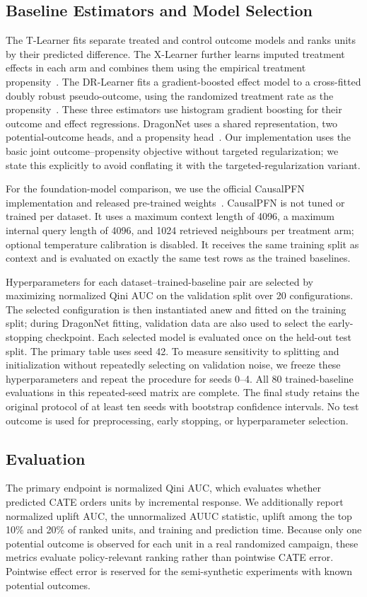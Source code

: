 \documentclass[twocolumn]{style}
\begin{document}
\subsection{Baseline Estimators and Model Selection}
The T-Learner fits separate treated and control outcome models and ranks units by their predicted
difference. The X-Learner further learns imputed treatment effects in each arm and combines them
using the empirical treatment propensity~\cite{kunzel2019metalearners}. The DR-Learner fits a
gradient-boosted effect model to a cross-fitted doubly robust pseudo-outcome, using the randomized
treatment rate as the propensity~\cite{kennedy2023drlearner}. These three estimators use histogram
gradient boosting for their outcome and effect regressions. DragonNet uses a shared representation,
two potential-outcome heads, and a propensity head~\cite{shi2019dragonnet}. Our implementation uses
the basic joint outcome--propensity objective without targeted regularization; we state this
explicitly to avoid conflating it with the targeted-regularization variant.

For the foundation-model comparison, we use the official CausalPFN implementation and released
pre-trained weights~\cite{balazadeh2025causalpfn}. CausalPFN is not tuned or trained per dataset. It
uses a maximum context length of 4096, a maximum internal query length of 4096, and 1024 retrieved
neighbours per treatment arm; optional temperature calibration is disabled. It receives the same
training split as context and is evaluated on exactly the same test rows as the trained baselines.

Hyperparameters for each dataset--trained-baseline pair are selected by maximizing normalized Qini
AUC on the validation split over 20 configurations. The selected configuration is then
instantiated anew and fitted on the training split; during DragonNet fitting, validation data are
also used to select the early-stopping checkpoint. Each selected model is evaluated once on the
held-out test split. The primary table uses seed 42. To measure sensitivity to splitting and
initialization without repeatedly selecting on validation noise, we freeze these hyperparameters
and repeat the procedure for seeds 0--4. All 80 trained-baseline evaluations in this repeated-seed
matrix are complete. The final study retains the original protocol of at least ten seeds with
bootstrap confidence intervals. No test outcome is used for preprocessing, early stopping, or
hyperparameter selection.

\subsection{Evaluation}
The primary endpoint is normalized Qini AUC, which evaluates whether predicted CATE orders units by
incremental response. We additionally report normalized uplift AUC, the unnormalized AUUC statistic,
uplift among the top 10\% and 20\% of ranked units, and training and prediction time. Because only one
potential outcome is observed for each unit in a real randomized campaign, these metrics evaluate
policy-relevant ranking rather than pointwise CATE error. Pointwise effect error is reserved for the
semi-synthetic experiments with known potential outcomes.
\end{document}
